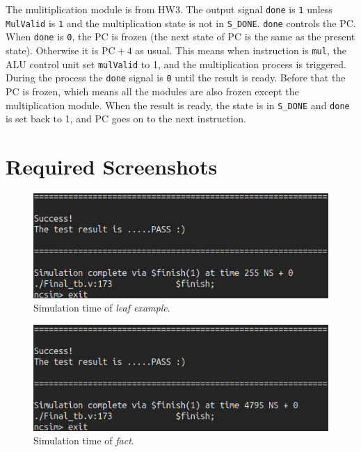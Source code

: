 \documentclass[12pt]{article}
\begin{document}
The mulitiplication module is from HW3. The output signal \texttt{done} is 
\texttt{1} unless \texttt{MulValid} is \texttt{1} and the multiplication state
is not in \texttt{S\_DONE}. \texttt{done} controls the PC. When \texttt{done} is
\texttt{0}, the PC is frozen (the next state of PC is the same as the present state).
Otherwise it is $\text{PC}+4$ as usual. This means when instruction is \texttt{mul},
the ALU control unit set \texttt{mulValid} to 1, and the multiplication process
is triggered. During the process the \texttt{done} signal is \texttt{0} until
the result is ready. Before that the PC is frozen, which means all the modules
are also frozen except the multiplication module. When the result is ready, the
state is in \texttt{S\_DONE} and \texttt{done} is set back to 1, and PC goes 
on to the next instruction.


\section{Required Screenshots}%
\label{sec:required_screenshots}

\begin{figure}[H]
	\centering
	\includegraphics[width=\linewidth]{./leaf.png}
	\caption{Simulation time of \textit{leaf example}.}%
	\label{fig:leaf}
\end{figure}

\begin{figure}[H]
	\centering
	\includegraphics[width=\linewidth]{./fact.png}
	\caption{Simulation time of \textit{fact}.}%
	\label{fig:fact}
\end{figure}
\end{document}
